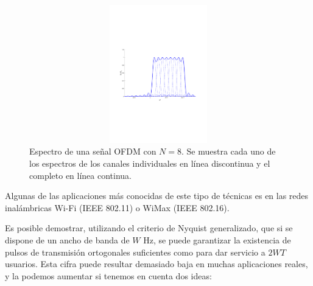 \documentclass[es,apuntes]{uah}
\begin{document}
\begin{figure}[h!]
	\centering\includegraphics[width=12cm,height=6cm]{./Figuras/OFDM.pdf}
	\caption{Espectro de una señal OFDM con $N=8$. Se muestra cada uno de los espectros de los canales individuales en línea discontinua y el completo en línea continua.}
	\label{fig:OFDM}
\end{figure}


Algunas de las aplicaciones más conocidas de este tipo de técnicas es en las redes inalámbricas Wi-Fi (IEEE 802.11) o WiMax (IEEE 802.16).

Es posible demostrar, utilizando el criterio de Nyquist generalizado, que si se dispone de un ancho de banda de $W$ Hz, se puede garantizar la existencia de pulsos de transmisión ortogonales suficientes como para dar servicio a $2WT$ usuarios. Esta cifra puede resultar demasiado baja en muchas aplicaciones reales, y la podemos aumentar si tenemos en cuenta dos ideas:
\end{document}
